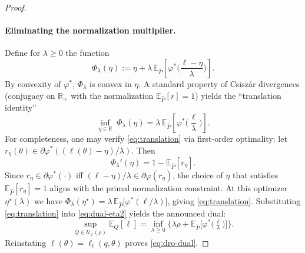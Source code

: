 \documentclass[11pt]{article}
\theoremstyle{plain}
\theoremstyle{definition}
\theoremstyle{remark}
\begin{document}
\begin{proof}
\paragraph{Eliminating the normalization multiplier.}
Define for $\lambda\ge0$ the function
\[
\Phi_\lambda(\eta)
:=\eta+\lambda\,\mathbb E_{\hat P}\!\left[\varphi^*\!\Big(\frac{\ell-\eta}{\lambda}\Big)\right].
\]
By convexity of $\varphi^*$, $\Phi_\lambda$ is convex in $\eta$.  
A standard property of Csiszár divergences (conjugacy on $\mathbb R_+$ with the normalization $\mathbb E_{\hat P}[r]=1$) yields the “translation identity”
\begin{equation}\label{eq:translation}
\inf_{\eta\in\mathbb R}\;\Phi_\lambda(\eta)
=\lambda\,\mathbb E_{\hat P}\!\left[\varphi^*\!\Big(\frac{\ell}{\lambda}\Big)\right].
\end{equation}
For completeness, one may verify \eqref{eq:translation} via first-order optimality:
let $r_\eta(\theta)\in\partial\varphi^*((\ell(\theta)-\eta)/\lambda)$.
Then
\[
\Phi_\lambda'(\eta)
=1-\mathbb E_{\hat P}[r_\eta].
\]
Since $r_\eta\in\partial\varphi^*(\cdot)$ iff $(\ell-\eta)/\lambda\in\partial\varphi(r_\eta)$,
the choice of $\eta$ that satisfies $\mathbb E_{\hat P}[r_\eta]=1$
aligns with the primal normalization constraint.
At this optimizer $\eta^\star(\lambda)$ we have
$\Phi_\lambda(\eta^\star)=\lambda\,\mathbb E_{\hat P}\!\big[\varphi^*(\ell/\lambda)\big]$,
giving \eqref{eq:translation}.  
Substituting \eqref{eq:translation} into \eqref{eq:dual-eta2} yields the announced dual:
\[
\sup_{Q\in\mathcal U_\varphi(\rho)} \mathbb E_Q[\ell]
=\inf_{\lambda\ge0}\Big\{
\lambda\rho+\mathbb E_{\hat P}\big[\varphi^*\!\big(\tfrac{\ell}{\lambda}\big)\big]
\Big\}.
\]
Reinstating $\ell(\theta)=\ell_t(q,\theta)$ proves \eqref{eq:dro-dual}.


\end{proof}
\end{document}
